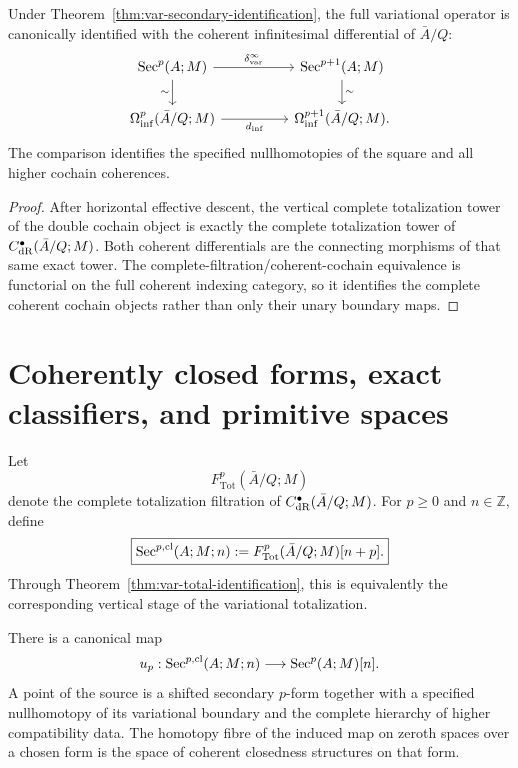 \begin{theorem}
\label{thm:var-operator-identification}
Under Theorem~\ref{thm:var-secondary-identification}, the full variational operator is canonically identified with the coherent infinitesimal differential of \(\bar A/Q\):
\[
\begin{tikzcd}[column sep=huge]
\Sec^p(A;M)
  \arrow[r,"\delta^{\infty}_{\mathrm{var}}"]
  \arrow[d,"\sim"']
& \Sec^{p+1}(A;M)
  \arrow[d,"\sim"]
\\
\Omegainf^p(\bar A/Q;M)
  \arrow[r,"d_{\mathrm{inf}}"']
& \Omegainf^{p+1}(\bar A/Q;M).
\end{tikzcd}
\]
The comparison identifies the specified nullhomotopies of the square and all higher cochain coherences.
\end{theorem}

\begin{proof}
After horizontal effective descent, the vertical complete totalization tower of the double cochain object is exactly the complete totalization tower of \(C_{\mathrm{dR}}^{\bullet}(\bar A/Q;M)\). Both coherent differentials are the connecting morphisms of that same exact tower. The complete-filtration/coherent-cochain equivalence is functorial on the full coherent indexing category, so it identifies the complete coherent cochain objects rather than only their unary boundary maps.
\end{proof}

\section{Coherently closed forms, exact classifiers, and primitive spaces}
\label{sec:var-closed-primitive}

\begin{definition}
\label{def:var-closed}
Let
\[
    F_{\mathrm{Tot}}^p(\bar A/Q;M)
\]
denote the complete totalization filtration of \(C_{\mathrm{dR}}^{\bullet}(\bar A/Q;M)\). For \(p\ge0\) and \(n\in\mathbb Z\), define
\[
    \boxed{
    \operatorname{Sec}^{p,\mathrm{cl}}(A;M;n)
    :=
    F_{\mathrm{Tot}}^p(\bar A/Q;M)[n+p].
    }
\]
Through Theorem~\ref{thm:var-total-identification}, this is equivalently the corresponding vertical stage of the variational totalization.
\end{definition}

\begin{proposition}
\label{prop:var-underlying-closed}
There is a canonical map
\[
    u_p:
    \operatorname{Sec}^{p,\mathrm{cl}}(A;M;n)
    \longrightarrow
    \operatorname{Sec}^p(A;M)[n].
\]
A point of the source is a shifted secondary \(p\)-form together with a specified nullhomotopy of its variational boundary and the complete hierarchy of higher compatibility data. The homotopy fibre of the induced map on zeroth spaces over a chosen form is the space of coherent closedness structures on that form.
\end{proposition}


